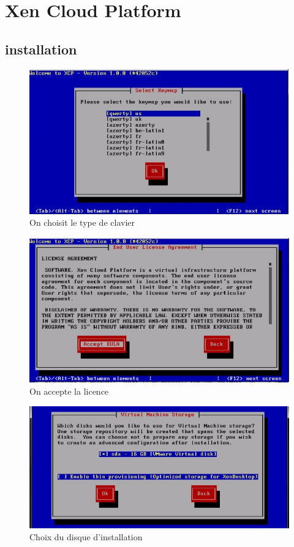 \chapter{Xen Cloud Platform}
\section{installation}
\begin{figure}
\begin{center}
\includegraphics[width=350pt]{images/1.png}
\end{center}
\caption{On choisit le  type de clavier}
\end{figure}
\begin{figure}
\begin{center}
\includegraphics[width=350pt]{images/2.png}
\end{center}
\caption{On accepte la licence}
\end{figure}
\begin{figure}
\begin{center}
\includegraphics[width=350pt]{images/3.png}
\end{center}
\caption{Choix du disque d'installation}
\end{figure}
